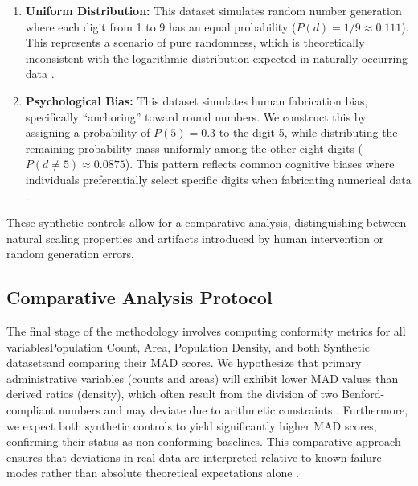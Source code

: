 \documentclass[11pt,a4paper]{article}
\begin{document}
\begin{enumerate}
    \item \textbf{Uniform Distribution:} This dataset simulates random number generation where each digit from 1 to 9 has an equal probability ($P(d) = 1/9 \approx 0.111$). This represents a scenario of pure randomness, which is theoretically inconsistent with the logarithmic distribution expected in naturally occurring data \cite{Le2024BenfordsLA}.
    \item \textbf{Psychological Bias:} This dataset simulates human fabrication bias, specifically ``anchoring'' toward round numbers. We construct this by assigning a probability of $P(5) = 0.3$ to the digit 5, while distributing the remaining probability mass uniformly among the other eight digits ($P(d \neq 5) \approx 0.0875$). This pattern reflects common cognitive biases where individuals preferentially select specific digits when fabricating numerical data \cite{Mumic2021AMT}.
\end{enumerate}

These synthetic controls allow for a comparative analysis, distinguishing between natural scaling properties and artifacts introduced by human intervention or random generation errors.

\subsection{Comparative Analysis Protocol}

The final stage of the methodology involves computing conformity metrics for all variablesPopulation Count, Area, Population Density, and both Synthetic datasetsand comparing their MAD scores. We hypothesize that primary administrative variables (counts and areas) will exhibit lower MAD values than derived ratios (density), which often result from the division of two Benford-compliant numbers and may deviate due to arithmetic constraints \cite{Druica2018BenfordsLA}. Furthermore, we expect both synthetic controls to yield significantly higher MAD scores, confirming their status as non-conforming baselines. This comparative approach ensures that deviations in real data are interpreted relative to known failure modes rather than absolute theoretical expectations alone \cite{Fernandes2024UnveilingMN}.
\end{document}
